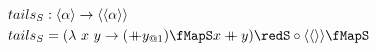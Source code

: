 \documentclass[preview]{standalone}
\begin{document}
\begin{align*}
  tails_S &: \vect{\alpha} \rightarrow \vect{\vect{\alpha}} \\
  tails_S & = (\lambda\ x\ y \rightarrow (\fcat y_{@1}) \fMapS x \fcat y) \redS \circ \vect{\vect{}} \fMapS
\end{align*}
\end{document}
